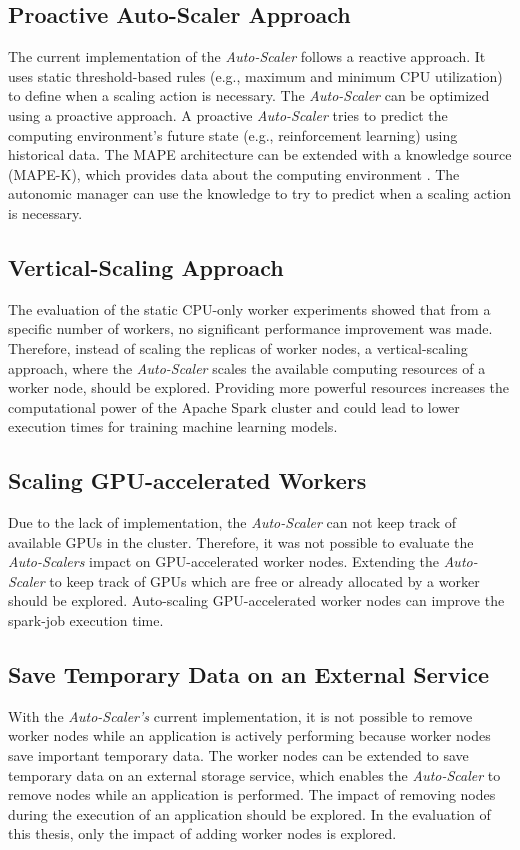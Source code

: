 \subsection{Proactive Auto-Scaler Approach}
The current implementation of the \textit{Auto-Scaler} follows a reactive approach. It uses static threshold-based rules (e.g., maximum and minimum CPU utilization) to define when a scaling action is necessary.
The \textit{Auto-Scaler} can be optimized using a proactive approach. A proactive \textit{Auto-Scaler} tries to predict the computing environment's future state (e.g., reinforcement learning) using historical data.
The MAPE architecture can be extended with a knowledge source (MAPE-K), which provides data about the computing environment \cite{Sinreich2006AnAB}. The autonomic manager can use the knowledge to try to predict when a scaling action is necessary.


\subsection{Vertical-Scaling Approach}
The evaluation of the static CPU-only worker experiments showed that from a specific number of workers, no significant performance improvement was made.
Therefore, instead of scaling the replicas of worker nodes, a vertical-scaling approach, where the \textit{Auto-Scaler} scales the available computing resources of a worker node, should be explored.
Providing more powerful resources increases the computational power of the Apache Spark cluster and could lead to lower execution times for training machine learning models.


\subsection{Scaling GPU-accelerated Workers}
\label{subsec:08_outlook_gpus}
Due to the lack of implementation, the \textit{Auto-Scaler} can not keep track of available GPUs in the cluster. Therefore, it was not possible to evaluate the \textit{Auto-Scalers} impact on GPU-accelerated worker nodes.
Extending the \textit{Auto-Scaler} to keep track of GPUs which are free or already allocated by a worker should be explored.
%
Auto-scaling GPU-accelerated worker nodes can improve the spark-job execution time.


\subsection{Save Temporary Data on an External Service}
With the \textit{Auto-Scaler's} current implementation, it is not possible to remove worker nodes while an application is actively performing because worker nodes save important temporary data.
The worker nodes can be extended to save temporary data on an external storage service, which enables the \textit{Auto-Scaler} to remove nodes while an application is performed.
% 
The impact of removing nodes during the execution of an application should be explored. In the evaluation of this thesis, only the impact of adding worker nodes is explored.


